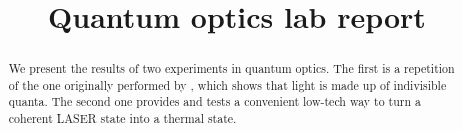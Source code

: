 \documentclass[11pt]{article}
\title{Quantum optics lab report}
\begin{document}
\maketitle

\begin{abstract}
We present the results of two experiments in quantum optics. The first is a repetition of the one originally performed by \textcite[]{grangierExperimentalEvidencePhoton1986}, which shows that light is made up of indivisible quanta. The second one provides and tests a convenient low-tech way to turn a coherent LASER state into a thermal state.  
\end{abstract}




\printbibliography
\end{document}
